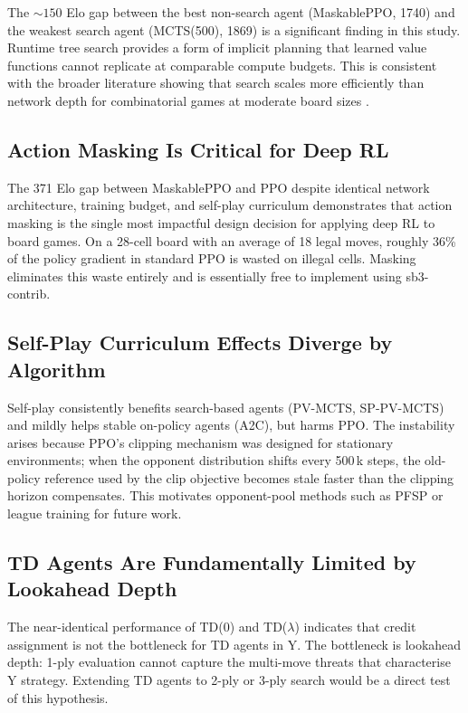 \documentclass[conference]{IEEEtran}
\begin{document}
The ${\sim}150$ Elo gap between the best non-search agent (MaskablePPO, 1740)
and the weakest search agent (MCTS(500), 1869) is a significant finding
in this study. Runtime tree search provides a form of implicit planning that
learned value functions cannot replicate at comparable compute budgets. This is
consistent with the broader literature showing that search scales more efficiently
than network depth for combinatorial games at moderate board sizes \cite{silver2017}.

\subsection{Action Masking Is Critical for Deep RL}

The 371 Elo gap between MaskablePPO and PPO despite identical network
architecture, training budget, and self-play curriculum demonstrates that action
masking is the single most impactful design decision for applying deep RL to board
games. On a 28-cell board with an average of 18 legal moves, roughly 36\% of the
policy gradient in standard PPO is wasted on illegal cells. Masking eliminates
this waste entirely and is essentially free to implement using sb3-contrib.

\subsection{Self-Play Curriculum Effects Diverge by Algorithm}

Self-play consistently benefits search-based agents (PV-MCTS, SP-PV-MCTS)
and mildly helps stable on-policy agents (A2C), but harms PPO. The instability
arises because PPO's clipping mechanism was designed for stationary environments;
when the opponent distribution shifts every 500\,k steps, the old-policy
reference used by the clip objective becomes stale faster than the clipping
horizon compensates. This motivates opponent-pool methods such as PFSP
\cite{vinyals2019} or league training for future work.

\subsection{TD Agents Are Fundamentally Limited by Lookahead Depth}

The near-identical performance of TD(0) and TD($\lambda$) indicates that credit
assignment is not the bottleneck for TD agents in Y. The bottleneck is lookahead
depth: 1-ply evaluation cannot capture the multi-move threats that characterise
Y strategy. Extending TD agents to 2-ply or 3-ply search would be a direct test
of this hypothesis.
\end{document}
